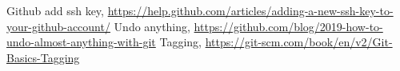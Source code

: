 \begin{thebibliography}{99999}
\singlespace\normalsize

 Github add ssh key, \url{https://help.github.com/articles/adding-a-new-ssh-key-to-your-github-account/}
 Undo anything, \url{https://github.com/blog/2019-how-to-undo-almost-anything-with-git}
 Tagging, \url{https://git-scm.com/book/en/v2/Git-Basics-Tagging}
\end{thebibliography}